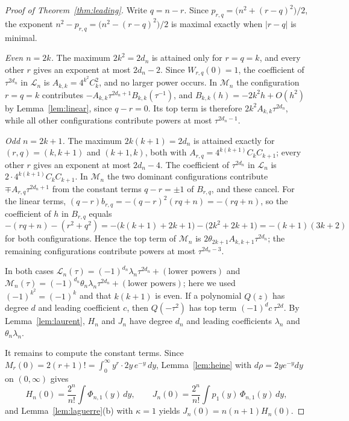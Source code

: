 \documentclass[11pt]{amsart}
\theoremstyle{remark}
\numberwithin{equation}{section}
\newcommand{\abs}[1]{\lvert #1\rvert}
\begin{document}
\begin{proof}[Proof of Theorem~\ref{thm:leading}]
Write $q=n-r$. Since $p_{r,q}=\bigl(n^2+(r-q)^2\bigr)/2$, the exponent $n^2-p_{r,q}=\bigl(n^2-(r-q)^2\bigr)/2$ is maximal exactly when $\abs{r-q}$ is minimal.

\emph{Even $n=2k$.} The maximum $2k^2=2d_n$ is attained only for $r=q=k$, and every other $r$ gives an exponent at most $2d_n-2$. Since $W_{r,q}(0)=1$, the coefficient of $\tau^{2d_n}$ in $\mathcal L_n$ is $A_{k,k}=4^{k^2}C_k^2$, and no larger power occurs. In $\mathcal M_n$ the configuration $r=q=k$ contributes $-A_{k,k}\tau^{2d_n+1}B_{k,k}(\tau^{-1})$, and $B_{k,k}(h)=-2k^2h+O(h^2)$ by Lemma~\ref{lem:linear}, since $q-r=0$. Its top term is therefore $2k^2A_{k,k}\tau^{2d_n}$, while all other configurations contribute powers at most $\tau^{2d_n-1}$.

\emph{Odd $n=2k+1$.} The maximum $2k(k+1)=2d_n$ is attained exactly for $(r,q)=(k,k+1)$ and $(k+1,k)$, both with $A_{r,q}=4^{k(k+1)}C_kC_{k+1}$; every other $r$ gives an exponent at most $2d_n-4$. The coefficient of $\tau^{2d_n}$ in $\mathcal L_n$ is $2\cdot4^{k(k+1)}C_kC_{k+1}$. In $\mathcal M_n$ the two dominant configurations contribute $\mp A_{r,q}\tau^{2d_n+1}$ from the constant terms $q-r=\pm1$ of $B_{r,q}$, and these cancel. For the linear terms, $(q-r)b_{r,q}=-(q-r)^2(rq+n)=-(rq+n)$, so the coefficient of $h$ in $B_{r,q}$ equals
\[
-(rq+n)-(r^2+q^2)=-\bigl(k(k+1)+2k+1\bigr)-\bigl(2k^2+2k+1\bigr)=-(k+1)(3k+2)
\]
for both configurations. Hence the top term of $\mathcal M_n$ is $2\theta_{2k+1}A_{k,k+1}\tau^{2d_n}$; the remaining configurations contribute powers at most $\tau^{2d_n-3}$.

In both cases $\mathcal L_n(\tau)=(-1)^{d_n}\lambda_n\tau^{2d_n}+(\text{lower powers})$ and $\mathcal M_n(\tau)=(-1)^{d_n}\theta_n\lambda_n\tau^{2d_n}+(\text{lower powers})$; here we used $(-1)^{k^2}=(-1)^k$ and that $k(k+1)$ is even. If a polynomial $Q(z)$ has degree $d$ and leading coefficient $c$, then $Q(-\tau^2)$ has top term $(-1)^dc\,\tau^{2d}$. By Lemma~\ref{lem:laurent}, $H_n$ and $J_n$ have degree $d_n$ and leading coefficients $\lambda_n$ and $\theta_n\lambda_n$.

It remains to compute the constant terms. Since $M_r(0)=2(r+1)!=\int_0^\infty y^r\cdot2y\,e^{-y}\,dy$, Lemma~\ref{lem:heine} with $d\rho=2ye^{-y}dy$ on $(0,\infty)$ gives
\[
H_n(0)=\frac{2^n}{n!}\int\Phi_{n,1}(y)\,dy,\qquad J_n(0)=\frac{2^n}{n!}\int p_1(y)\,\Phi_{n,1}(y)\,dy,
\]
and Lemma~\ref{lem:laguerre}(b) with $\kappa=1$ yields $J_n(0)=n(n+1)H_n(0)$.
\end{proof}
\end{document}
